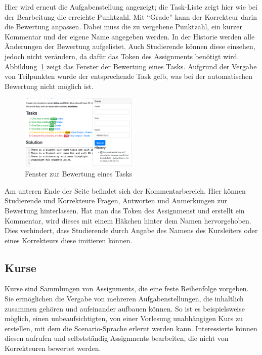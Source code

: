 Hier wird erneut die Aufgabenstellung angezeigt;
die Task-Liste zeigt hier wie bei der Bearbeitung die erreichte Punktzahl.
Mit ``Grade'' kann der Korrekteur darin die Bewertung anpassen.
Dabei muss die zu vergebene Punktzahl, ein kurzer Kommentar und der eigene Name angegeben werden.
In der Historie werden alle Änderungen der Bewertung aufgelistet.
Auch Studierende können diese einsehen, jedoch nicht verändern, da dafür das Token des Assignments benötigt wird.
Abbildung~\ref{fig:grade-popover} zeigt das Fenster der Bewertung eines Tasks.
Aufgrund der Vergabe von Teilpunkten wurde der entsprechende Task gelb, was bei der automatischen Bewertung nicht möglich ist.

\begin{figure}
    \centering
    \includegraphics[width=0.5\textwidth]{chapter/fulib.org/img/grade-popover.png}
    \caption{Fenster zur Bewertung eines Tasks}
    \label{fig:grade-popover}
\end{figure}

Am unteren Ende der Seite befindet sich der Kommentarbereich.
Hier können Studierende und Korrekteure Fragen, Antworten und Anmerkungen zur Bewertung hinterlassen.
Hat man das Token des Assignmenst und erstellt ein Kommentar,
wird dieses mit einem Häkchen hinter dem Namen hervorgehoben.
Dies verhindert, dass Studierende durch Angabe des Namens des Kursleiters oder eines Korrekteurs diese imitieren können.

\subsection{Kurse}\label{subsec:courses}

Kurse sind Sammlungen von Assignments, die eine feste Reihenfolge vorgeben.
Sie ermöglichen die Vergabe von mehreren Aufgabenstellungen, die inhaltlich zusammen gehören und aufeinander aufbauen können.
So ist es beispielsweise möglich, einen unbeaufsichtigten, von einer Vorlesung unabhängigen Kurs zu erstellen, mit dem die Scenario-Sprache erlernt werden kann.
Interessierte können diesen aufrufen und selbstständig Assignments bearbeiten, die nicht von Korrekteuren bewertet werden.

